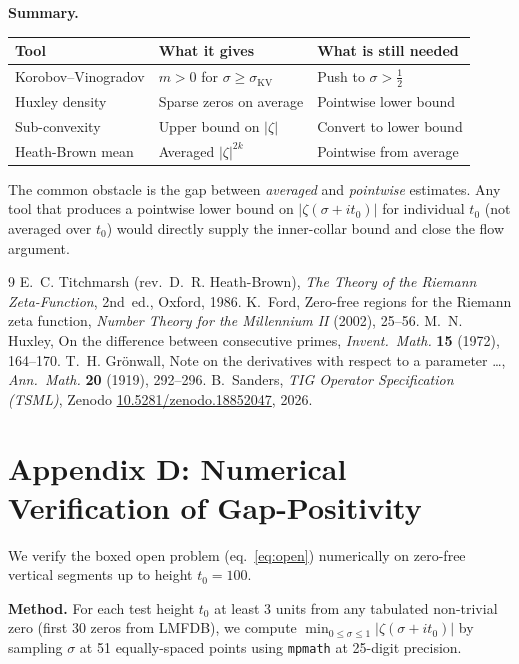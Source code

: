 \documentclass[11pt]{article}
\begin{document}
\medskip\noindent\textbf{Summary.}
\begin{center}
\begin{tabular}{lll}
\hline
Tool & What it gives & What is still needed \\
\hline
Korobov--Vinogradov & $m>0$ for $\sigma\ge\sigma_{\mathrm{KV}}$ & Push to $\sigma>\tfrac12$ \\
Huxley density & Sparse zeros on average & Pointwise lower bound \\
Sub-convexity & Upper bound on $|\zeta|$ & Convert to lower bound \\
Heath-Brown mean & Averaged $|\zeta|^{2k}$ & Pointwise from average \\
\hline
\end{tabular}
\end{center}
The common obstacle is the gap between \emph{averaged} and
\emph{pointwise} estimates.
Any tool that produces a pointwise lower bound on $|\zeta(\sigma+it_0)|$
for individual $t_0$ (not averaged over $t_0$) would directly supply
the inner-collar bound and close the flow argument.

\begin{thebibliography}{9}
  E.~C. Titchmarsh (rev.\ D.~R. Heath-Brown),
  \textit{The Theory of the Riemann Zeta-Function}, 2nd~ed.,
  Oxford, 1986.
  K.~Ford,
  Zero-free regions for the Riemann zeta function,
  \textit{Number Theory for the Millennium II} (2002), 25--56.
  M.~N. Huxley,
  On the difference between consecutive primes,
  \textit{Invent.\ Math.} \textbf{15} (1972), 164--170.
  T.~H. Gr\"onwall,
  Note on the derivatives with respect to a parameter \ldots,
  \textit{Ann.\ Math.} \textbf{20} (1919), 292--296.
  B.~Sanders, \textit{TIG Operator Specification (TSML)},
  Zenodo \href{https://doi.org/10.5281/zenodo.18852047}{10.5281/zenodo.18852047},
  2026.
\end{thebibliography}


\section*{Appendix D: Numerical Verification of Gap-Positivity}

We verify the boxed open problem (eq.~\ref{eq:open}) numerically
on zero-free vertical segments up to height $t_0=100$.

\medskip\noindent\textbf{Method.}
For each test height $t_0$ at least $3$ units from any tabulated
non-trivial zero (first 30 zeros from LMFDB), we compute
$\min_{0\le\sigma\le1}|\zeta(\sigma+it_0)|$
by sampling $\sigma$ at 51 equally-spaced points using \texttt{mpmath}
at 25-digit precision.
\end{document}
